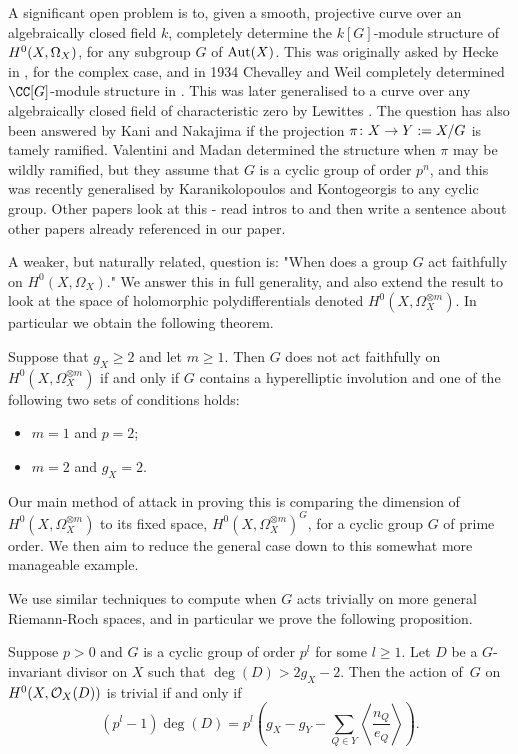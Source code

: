 A significant open problem is to, given a smooth, projective curve over an algebraically closed field $k$, completely determine the $k[G]$-module structure of ${H^0(X,\Omega_X)}$, for any subgroup $G$ of $\operatorname{Aut}(X)$.
This was originally asked by Hecke in , for the complex case, and in 1934 Chevalley and Weil completely determined $\CC[G]$-module structure in \cite{chev}.
This was later generalised to a curve over any algebraically closed field of characteristic zero by Lewittes \cite{lewittes}.
The question has also been answered by Kani \cite{Kani} and Nakajima \cite{naka2} if the projection $\pi \colon X \rightarrow Y:= X/G$ is tamely ramified.
Valentini and Madan determined the structure when $\pi$ may be wildly ramified, but they assume that $G$ is a cyclic group of order $p^n$, and this was recently generalised by Karanikolopoulos and Kontogeorgis to any cyclic group.
Other papers look at this - read intros to and then write a sentence about other papers already referenced in our paper.

A weaker, but naturally related, question is: "When does a group $G$ act faithfully on $H^0(X,\Omega_X)$."
We answer this in full generality, and also extend the result to look at the space of holomorphic polydifferentials denoted $H^0(X,\Omega_X^{\otimes m})$.
In particular we obtain the following theorem.
    \begin{unnumthm}
    Suppose that $g_X\geq 2$ and let $m\geq1$. 
    Then $G$ does not act faithfully on $H^0(X,\Omega_X^{\otimes m})$ if and only if $G$ contains a hyperelliptic involution and one of the following two sets of conditions holds:
        \begin{itemize}
        \item $m=1$ and $p=2$;
        \item $m=2$ and $g_X=2$.
        \end{itemize}
    \end{unnumthm}
Our main method of attack in proving this is comparing the dimension of $H^0(X,\Omega_X^{\otimes m})$ to its fixed space, $H^0(X,\Omega_X^{\otimes m})^G$, for a cyclic group $G$ of prime order.
We then aim to reduce the general case down to this somewhat more manageable example.

We use similar techniques to compute when $G$ acts trivially on more general Riemann-Roch spaces, and in particular we prove the following proposition.
    \begin{unnumprop}\label{nakaj}
    Suppose $p>0$ and $G$ is a cyclic group of order $p^l$ for some $l\geq 1$.
    Let $D$ be a $G$-invariant divisor on $X$ such that $\deg(D)>2g_X-2$.
    Then the action of~$G$ on $H^0(X,{\cal O}_X(D))$ is trivial if and only if
        \[ 
        (p^l-1)\deg(D)=p^l\left(g_X-g_Y-\sum_{Q\in Y}\left\langle \frac{n_Q}{e_Q} \right\rangle\right).
        \]
    \end{unnumprop}




